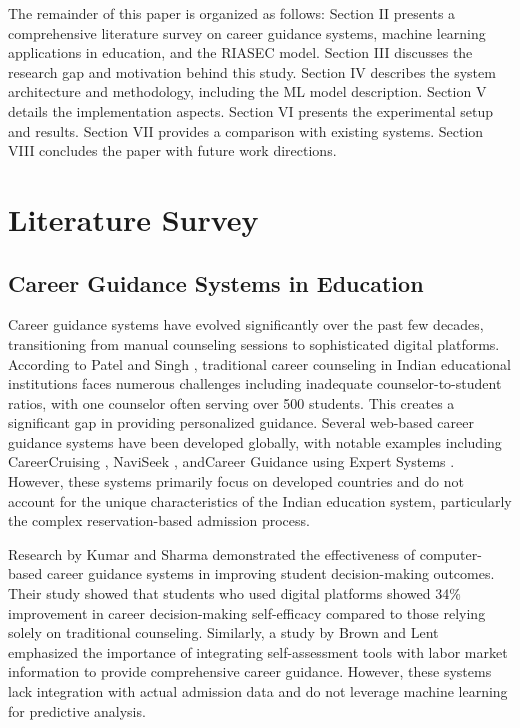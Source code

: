 \documentclass[journal]{IEEEtran}
\begin{document}
The remainder of this paper is organized as follows: Section II presents a comprehensive literature survey on career guidance systems, machine learning applications in education, and the RIASEC model. Section III discusses the research gap and motivation behind this study. Section IV describes the system architecture and methodology, including the ML model description. Section V details the implementation aspects. Section VI presents the experimental setup and results. Section VII provides a comparison with existing systems. Section VIII concludes the paper with future work directions.

\section{Literature Survey}

\subsection{Career Guidance Systems in Education}
Career guidance systems have evolved significantly over the past few decades, transitioning from manual counseling sessions to sophisticated digital platforms. According to Patel and Singh \cite{patel2020}, traditional career counseling in Indian educational institutions faces numerous challenges including inadequate counselor-to-student ratios, with one counselor often serving over 500 students. This creates a significant gap in providing personalized guidance. Several web-based career guidance systems have been developed globally, with notable examples including CareerCruising \cite{careercruising}, NaviSeek \cite{naviseek}, andCareer Guidance using Expert Systems \cite{expertsys}. However, these systems primarily focus on developed countries and do not account for the unique characteristics of the Indian education system, particularly the complex reservation-based admission process.

Research by Kumar and Sharma \cite{kumar2018} demonstrated the effectiveness of computer-based career guidance systems in improving student decision-making outcomes. Their study showed that students who used digital platforms showed 34\% improvement in career decision-making self-efficacy compared to those relying solely on traditional counseling. Similarly, a study by Brown and Lent \cite{brown2019} emphasized the importance of integrating self-assessment tools with labor market information to provide comprehensive career guidance. However, these systems lack integration with actual admission data and do not leverage machine learning for predictive analysis.
\end{document}
